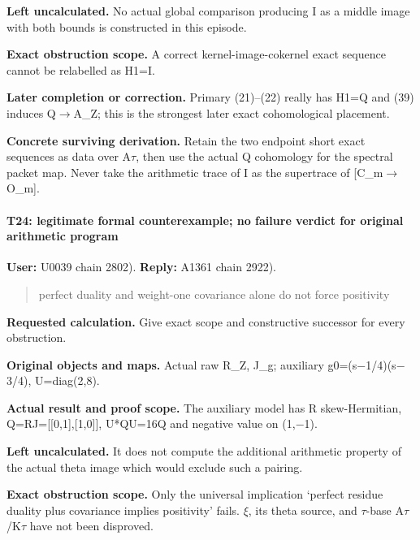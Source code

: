 \textbf{Left uncalculated.} No actual global comparison producing I as a
middle image with both bounds is constructed in this episode.

\textbf{Exact obstruction scope.} A correct kernel-image-cokernel exact
sequence cannot be relabelled as H1=I.

\textbf{Later completion or correction.} Primary (21)--(22) really has
H1=Q and (39) induces Q\allowbreak{}\ensuremath{→}\allowbreak{}A\_Z;
this is the strongest later exact cohomological placement.

\textbf{Concrete surviving derivation.} Retain the two endpoint short
exact sequences as data over A\allowbreak{}\ensuremath{τ}\allowbreak{},
then use the actual Q cohomology for the spectral packet map. Never take
the arithmetic trace of I as the supertrace of
[C\_m\allowbreak{}\ensuremath{→}\allowbreak{}O\_m].

\paragraph{T24: legitimate formal counterexample; no failure verdict for
original arithmetic
program}\label{t24-legitimate-formal-counterexample-no-failure-verdict-for-original-arithmetic-program}

\textbf{User:} U0039
\protect{} chain 2802).
\textbf{Reply:} A1361
\protect{} chain 2922).

\begin{quote}
perfect duality and weight-one covariance alone do not force positivity
\end{quote}

\textbf{Requested calculation.} Give exact scope and constructive
successor for every obstruction.

\textbf{Original objects and maps.} Actual raw R\_Z, J\_g; auxiliary
g0=(s\allowbreak{}\ensuremath{−}\allowbreak{}1/4)(s\allowbreak{}\ensuremath{−}\allowbreak{}3/4),
U=diag(2,8).

\textbf{Actual result and proof scope.} The auxiliary model has R
skew-Hermitian, Q=RJ={[}{[}0,1{]},{[}1,0{]}{]}, U*QU=16Q and negative
value on (1,\allowbreak{}\ensuremath{−}\allowbreak{}1).

\textbf{Left uncalculated.} It does not compute the additional
arithmetic property of the actual theta image which would exclude such a
pairing.

\textbf{Exact obstruction scope.} Only the universal implication
`perfect residue duality plus covariance implies positivity' fails.
\allowbreak{}\ensuremath{ξ}\allowbreak{}, its theta source, and
\allowbreak{}\ensuremath{τ}\allowbreak{}-base
A\allowbreak{}\ensuremath{τ}\allowbreak{}/K\allowbreak{}\ensuremath{τ}\allowbreak{}
have not been disproved.

